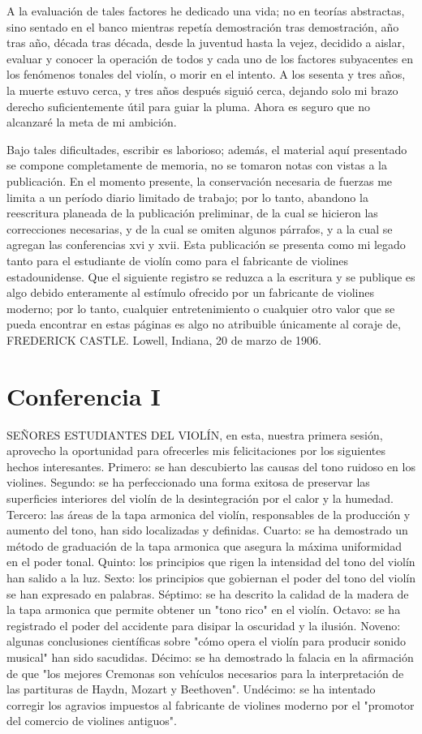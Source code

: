 \documentclass[12pt]{book}
\begin{document}
A la evaluación de tales factores he dedicado una vida; no en teorías abstractas, sino sentado en el banco mientras repetía demostración tras demostración, año tras año, década tras década, desde la juventud hasta la vejez, decidido a aislar, evaluar y conocer la operación de todos y cada uno de los factores subyacentes en los fenómenos tonales del violín, o morir en el intento. A los sesenta y tres años, la muerte estuvo cerca, y tres años después siguió cerca, dejando solo mi brazo derecho suficientemente útil para guiar la pluma. Ahora es seguro que no alcanzaré la meta de mi ambición.

Bajo tales dificultades, escribir es laborioso; además, el material aquí presentado se compone completamente de memoria, no se tomaron notas con vistas a la publicación. En el momento presente, la conservación necesaria de fuerzas me limita a un período diario limitado de trabajo; por lo tanto, abandono la reescritura planeada de la publicación preliminar, de la cual se hicieron las correcciones necesarias, y de la cual se omiten algunos párrafos, y a la cual se agregan las conferencias xvi y xvii. Esta publicación se presenta como mi legado tanto para el estudiante de violín como para el fabricante de violines estadounidense. Que el siguiente registro se reduzca a la escritura y se publique es algo debido enteramente al estímulo ofrecido por un fabricante de violines moderno; por lo tanto, cualquier entretenimiento o cualquier otro valor que se pueda encontrar en estas páginas es algo no atribuible únicamente al coraje de, FREDERICK CASTLE. Lowell, Indiana, 20 de marzo de 1906.

\chapter*{Conferencia I}
SEÑORES ESTUDIANTES DEL VIOLÍN, en esta, nuestra primera sesión, aprovecho la oportunidad para ofrecerles mis felicitaciones por los siguientes hechos interesantes. Primero: se han descubierto las causas del tono ruidoso en los violines. Segundo: se ha perfeccionado una forma exitosa de preservar las superficies interiores del violín de la desintegración por el calor y la humedad. Tercero: las áreas de la tapa armonica del violín, responsables de la producción y aumento del tono, han sido localizadas y definidas. Cuarto: se ha demostrado un método de graduación de la tapa armonica que asegura la máxima uniformidad en el poder tonal. Quinto: los principios que rigen la intensidad del tono del violín han salido a la luz. Sexto: los principios que gobiernan el poder del tono del violín se han expresado en palabras. Séptimo: se ha descrito la calidad de la madera de la tapa armonica que permite obtener un "tono rico" en el violín. Octavo: se ha registrado el poder del accidente para disipar la oscuridad y la ilusión. Noveno: algunas conclusiones científicas sobre "cómo opera el violín para producir sonido musical" han sido sacudidas. Décimo: se ha demostrado la falacia en la afirmación de que "los mejores Cremonas son vehículos necesarios para la interpretación de las partituras de Haydn, Mozart y Beethoven". Undécimo: se ha intentado corregir los agravios impuestos al fabricante de violines moderno por el "promotor del comercio de violines antiguos".
\end{document}
